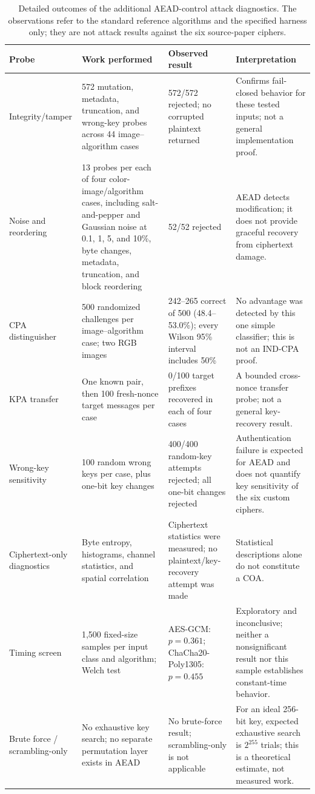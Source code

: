 \documentclass[letterpaper,journal]{IEEEtran}
\begin{document}
\begin{table}[!t]
\caption{Detailed outcomes of the additional AEAD-control attack diagnostics. The observations refer to the standard reference algorithms and the specified harness only; they are not attack results against the six source-paper ciphers.}
\label{tab:attack-outcomes}
\centering\small
\setlength{\tabcolsep}{4pt}\renewcommand{\arraystretch}{1.12}
\begin{tabular}{p{}p{}p{}p{}}
\toprule
Probe & Work performed & Observed result & Interpretation \\
\midrule
Integrity/tamper & 572 mutation, metadata, truncation, and wrong-key probes across 44 image--algorithm cases & 572/572 rejected; no corrupted plaintext returned & Confirms fail-closed behavior for these tested inputs; not a general implementation proof. \\
Noise and reordering & 13 probes per each of four color-image/algorithm cases, including salt-and-pepper and Gaussian noise at 0.1, 1, 5, and 10\%, byte changes, metadata, truncation, and block reordering & 52/52 rejected & AEAD detects modification; it does not provide graceful recovery from ciphertext damage. \\
CPA distinguisher & 500 randomized challenges per image--algorithm case; two RGB images & 242--265 correct of 500 (48.4--53.0\%); every Wilson 95\% interval includes 50\% & No advantage was detected by this one simple classifier; this is not an IND-CPA proof. \\
KPA transfer & One known pair, then 100 fresh-nonce target messages per case & 0/100 target prefixes recovered in each of four cases & A bounded cross-nonce transfer probe; not a general key-recovery result. \\
Wrong-key sensitivity & 100 random wrong keys per case, plus one-bit key changes & 400/400 random-key attempts rejected; all one-bit changes rejected & Authentication failure is expected for AEAD and does not quantify key sensitivity of the six custom ciphers. \\
Ciphertext-only diagnostics & Byte entropy, histograms, channel statistics, and spatial correlation & Ciphertext statistics were measured; no plaintext/key-recovery attempt was made & Statistical descriptions alone do not constitute a COA. \\
Timing screen & 1,500 fixed-size samples per input class and algorithm; Welch test & AES-GCM: $p=0.361$; ChaCha20-Poly1305: $p=0.455$ & Exploratory and inconclusive; neither a nonsignificant result nor this sample establishes constant-time behavior. \\
Brute force / scrambling-only & No exhaustive key search; no separate permutation layer exists in AEAD & No brute-force result; scrambling-only is not applicable & For an ideal 256-bit key, expected exhaustive search is $2^{255}$ trials; this is a theoretical estimate, not measured work. \\
\bottomrule
\end{tabular}
\end{table}
\end{document}
